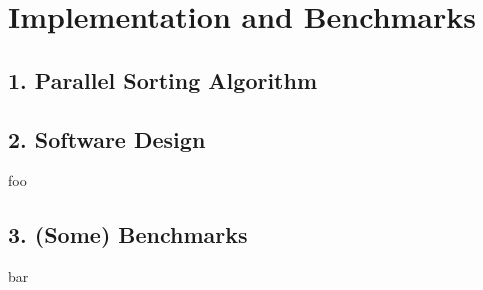 \section{Implementation and Benchmarks}

\subsection{1. Parallel Sorting Algorithm}

\begin{frame}
    \cite{Sundar2013}
\end{frame}

\subsection{2. Software Design}

\begin{frame}
    foo
\end{frame}

\subsection{3. (Some) Benchmarks}

\begin{frame}
    bar
\end{frame}